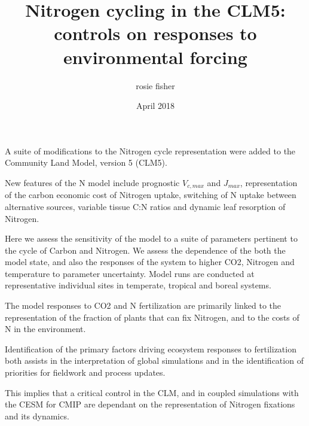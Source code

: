 \documentclass[draft,linenumbers]{agujournal}
\begin{document}

\title{Nitrogen cycling in the CLM5: controls on responses to environmental forcing}
\author{rosie fisher}
\date{April 2018}








\begin{keypoints}

\item A suite of modifications to the Nitrogen cycle representation were added to the Community Land Model, version 5 (CLM5).

\item New features of the N model include prognostic $V_{c,max}$ and $J_{max}$, representation of the carbon economic cost of Nitrogen uptake, switching of N uptake between alternative sources, variable tissue C:N ratios and dynamic leaf resorption of Nitrogen.

\item Here we assess the sensitivity of the model to a suite of parameters pertinent to the cycle of Carbon and Nitrogen. We assess the dependence of the both the model state, and also the responses of the system to higher CO2, Nitrogen and temperature to parameter uncertainty. Model runs are conducted at representative individual sites in temperate, tropical and boreal systems.

\item The model responses to CO2 and N fertilization are primarily linked to the representation of the fraction of plants that can fix Nitrogen, and to the costs of N in the environment.

\item Identification of the primary factors driving ecosystem responses to fertilization both assists in the interpretation of global simulations and in the identification of priorities for fieldwork and process updates.

\item This implies that a critical control in the CLM, and in coupled simulations with the CESM for CMIP are dependant on the representation of Nitrogen fixations and its dynamics.

\end{keypoints}
\end{document}
